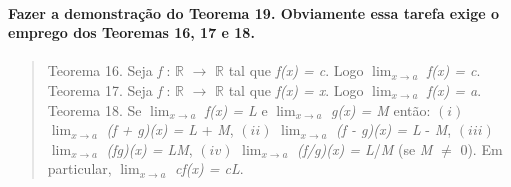 
\paragraph{Fazer a demonstração do Teorema 19. Obviamente essa tarefa exige o emprego dos Teoremas 16, 17 e 18.}

\begin{quote}
	Teorema 16. Seja \textit{f} : $\mathbb{R}$ $\rightarrow$ $\mathbb{R}$ tal que \textit{f(x) = c}. Logo $\lim_{x\rightarrow a}$ \textit{f(x) = c}.
	\newline
	Teorema 17. Seja \textit{f} : $\mathbb{R}$ $\rightarrow$ $\mathbb{R}$ tal que \textit{f(x) = x}. Logo $\lim_{x\rightarrow a}$ \textit{f(x) = a}.
	\newline
	Teorema 18. Se $\lim_{x\rightarrow a}$ \textit{f(x) = \textit{L}} e $\lim_{x\rightarrow a}$ \textit{g(x) = \textit{M}} então:\newline
	\textit{$(i)$} $\lim_{x\rightarrow a}$ \textit{(f + g)(x) = \textit{L}} + \textit{M}, \textit{$(ii)$} $\lim_{x\rightarrow a}$ \textit{(f - g)(x) = \textit{L}} - \textit{M},
	\newline
	\textit{$(iii)$} $\lim_{x\rightarrow a}$ \textit{(fg)(x) = \textit{L}}\textit{M}, 	\textit{$(iv)$} $\lim_{x\rightarrow a}$ \textit{(f/g)(x) = \textit{L}}/\textit{M} (se \textit{M} $\neq$ 0).
	\newline
	Em particular, $\lim_{x\rightarrow a}$ \textit{cf(x) = c\textit{L}}.
\end{quote}

